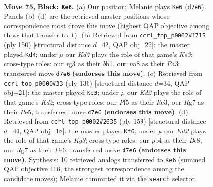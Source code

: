 \documentclass[11pt]{article}
\begin{document}
\clearpage

\begin{figure}[p]\centering
\begin{subfigure}{0.46\textwidth}\centering
\resizebox{\linewidth}{!}{%
\newchessgame
\chessboard[
  setfen={N7/p2k2r1/P1p3p1/2P2p1p/bP3P1P/6R1/5K2/8 b - - 6 75},
  showmover=false,
  pgfstyle=straightmove, color=movearrow, markmove={d7-e6}
]}
\caption{}
\end{subfigure}\hfill
\begin{subfigure}{0.46\textwidth}\centering
\resizebox{\linewidth}{!}{%
\newchessgame
\chessboard[
  setfen={8/4k3/5pp1/B6p/p1p1PP2/P3K1PP/1P6/1b6 w - - 11 76},
  showmover=false,
  pgfstyle=straightmove, color=movearrow, markmove={e3-d4}
]}
\caption{}
\end{subfigure}
\\[4pt]
\begin{subfigure}{0.46\textwidth}\centering
\resizebox{\linewidth}{!}{%
\newchessgame
\chessboard[
  setfen={8/3k1p2/6p1/1p2P1p1/pP4P1/P1R2P2/3K4/1r6 w - - 7 69},
  showmover=false,
  pgfstyle=straightmove, color=movearrow, markmove={d2-e3}
]}
\caption{}
\end{subfigure}\hfill
\begin{subfigure}{0.46\textwidth}\centering
\resizebox{\linewidth}{!}{%
\newchessgame
\chessboard[
  setfen={2b5/8/2P1p1k1/1p1p1p2/1P1P1P2/pB2P2P/8/7K b - - 17 80},
  showmover=false,
  pgfstyle=straightmove, color=movearrow, markmove={g6-f6}
]}
\caption{}
\end{subfigure}
\caption{\textbf{Move 75, Black: \texttt{Ke6}.} (a) Our position; Melanie plays \texttt{Ke6} (\texttt{d7e6}). Panels (b)--(d) are the retrieved master positions whose correspondence most drove this move (highest QAP objective among those that transfer to it). (b) Retrieved from \texttt{ccrl\_top\_p0002\#1715} (ply 150) [structural distance $d$=42, QAP obj=22]: the master played \texttt{Kd4}; under $\mu$ our \emph{Kd2} plays the role of that game's \emph{Ke3}; cross-type roles: our \emph{r}g3 as their \emph{b}b1, our \emph{n}a8 as their \emph{P}a3; transferred move \texttt{d7e6} \textbf{(endorses this move)}. (c) Retrieved from \texttt{ccrl\_top\_p0000\#33} (ply 136) [structural distance $d$=34, QAP obj=21]: the master played \texttt{Ke3}; under $\mu$ our \emph{Kd2} plays the role of that game's \emph{Kd2}; cross-type roles: our \emph{P}f5 as their \emph{R}c3, our \emph{R}g7 as their \emph{P}e5; transferred move \texttt{d7e6} \textbf{(endorses this move)}. (d) Retrieved from \texttt{ccrl\_top\_p0002\#2635} (ply 159) [structural distance $d$=40, QAP obj=18]: the master played \texttt{Kf6}; under $\mu$ our \emph{Kd2} plays the role of that game's \emph{Kg3}; cross-type roles: our \emph{p}b4 as their \emph{B}c8, our \emph{R}g7 as their \emph{P}e6; transferred move \texttt{d7e6} \textbf{(endorses this move)}. Synthesis: 10 retrieved analogs transferred to \texttt{Ke6} (summed QAP objective 116, the strongest correspondence among the candidate moves); Melanie committed it via the \texttt{search} selector.}
\label{fig:thought-m149}
\end{figure}
\end{document}
